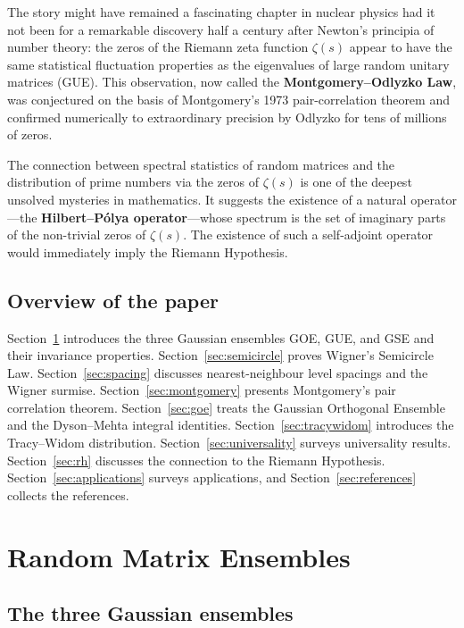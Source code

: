 \documentclass[12pt,a4paper]{amsart}
\theoremstyle{definition}
\theoremstyle{remark}
\begin{document}
The story might have remained a fascinating chapter in nuclear physics had
it not been for a remarkable discovery half a century after Newton's
principia of number theory: the zeros of the Riemann zeta function
$\zeta(s)$ appear to have the same statistical fluctuation properties as the
eigenvalues of large random unitary matrices (GUE). This observation,
now called the \textbf{Montgomery--Odlyzko Law}, was conjectured on the
basis of Montgomery's 1973 pair-correlation theorem \cite{Montgomery1973}
and confirmed numerically to extraordinary precision by Odlyzko
\cite{Odlyzko1987, Odlyzko2001} for tens of millions of zeros.

The connection between spectral statistics of random matrices and the
distribution of prime numbers via the zeros of $\zeta(s)$ is one of the
deepest unsolved mysteries in mathematics. It suggests the existence of a
natural operator---the \textbf{Hilbert--P\'olya operator}---whose spectrum
is the set of imaginary parts of the non-trivial zeros of $\zeta(s)$.
The existence of such a self-adjoint operator would immediately imply the
Riemann Hypothesis.

\subsection*{Overview of the paper}
Section~\ref{sec:ensembles} introduces the three Gaussian ensembles GOE,
GUE, and GSE and their invariance properties. Section~\ref{sec:semicircle}
proves Wigner's Semicircle Law. Section~\ref{sec:spacing} discusses
nearest-neighbour level spacings and the Wigner surmise.
Section~\ref{sec:montgomery} presents Montgomery's pair correlation theorem.
Section~\ref{sec:goe} treats the Gaussian Orthogonal Ensemble and the
Dyson--Mehta integral identities. Section~\ref{sec:tracywidom} introduces
the Tracy--Widom distribution. Section~\ref{sec:universality} surveys
universality results. Section~\ref{sec:rh} discusses the connection to the
Riemann Hypothesis. Section~\ref{sec:applications} surveys applications,
and Section~\ref{sec:references} collects the references.

\section{Random Matrix Ensembles}
\label{sec:ensembles}

\subsection{The three Gaussian ensembles}
\end{document}

